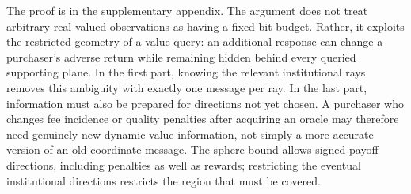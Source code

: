 The proof is in the supplementary appendix. The argument does not treat arbitrary real-valued observations as having a fixed bit budget. Rather, it exploits the restricted geometry of a value query: an additional response can change a purchaser's adverse return while remaining hidden behind every queried supporting plane. In the first part, knowing the relevant institutional rays removes this ambiguity with exactly one message per ray. In the last part, information must also be prepared for directions not yet chosen. A purchaser who changes fee incidence or quality penalties after acquiring an oracle may therefore need genuinely new dynamic value information, not simply a more accurate version of an old coordinate message. The sphere bound allows signed payoff directions, including penalties as well as rewards; restricting the eventual institutional directions restricts the region that must be covered.
